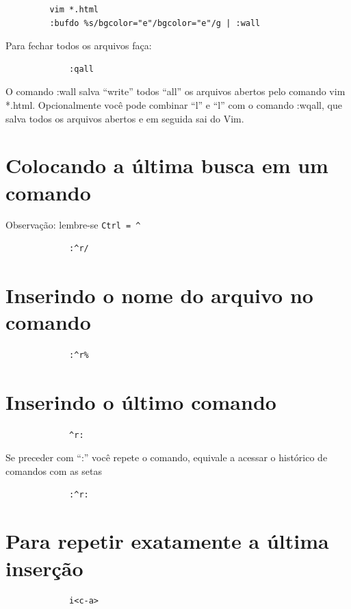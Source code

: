 \documentclass[10pt,a4paper,openany]{book}
\begin{document}
\begin{verbatim}
		 vim *.html
		 :bufdo %s/bgcolor="e"/bgcolor="e"/g | :wall
\end{verbatim}

Para fechar todos os arquivos faça:

\begin{verbatim}
			 :qall
\end{verbatim}

O comando :wall salva ``write'' todos ``all'' os arquivos
abertos pelo comando vim *.html. Opcionalmente você pode
combinar ``l'' e ``l'' com o comando :wqall, que
salva todos os arquivos abertos e em seguida sai do Vim.

\section{Colocando a última busca em um comando }
Observação: lembre-se \verb|Ctrl = ^|

\begin{verbatim}
			 :^r/
\end{verbatim}

\section{Inserindo o nome do arquivo no comando }

\begin{verbatim}
			 :^r%
\end{verbatim}

\section{Inserindo o último comando }

\begin{verbatim}
			 ^r:
\end{verbatim}

Se preceder com ``:'' você repete o comando, equivale a acessar o histórico de comandos com as setas

\begin{verbatim}
			 :^r:
\end{verbatim}

\section{Para repetir exatamente a última inserção }

\begin{verbatim}
			 i<c-a>
\end{verbatim}
\end{document}
